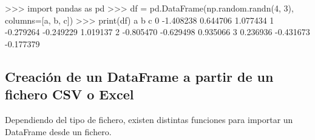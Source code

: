 \documentclass[
  spanish,
  a4paper,
]{scrreport}
\newenvironment{Shaded}{\begin{snugshade}}{\end{snugshade}}
\newcommand{\BuiltInTok}[1]{\textcolor[rgb]{0.00,0.23,0.31}{#1}}
\newcommand{\DecValTok}[1]{\textcolor[rgb]{0.68,0.00,0.00}{#1}}
\newcommand{\FloatTok}[1]{\textcolor[rgb]{0.68,0.00,0.00}{#1}}
\newcommand{\ImportTok}[1]{\textcolor[rgb]{0.00,0.46,0.62}{#1}}
\newcommand{\NormalTok}[1]{\textcolor[rgb]{0.00,0.23,0.31}{#1}}
\newcommand{\OperatorTok}[1]{\textcolor[rgb]{0.37,0.37,0.37}{#1}}
\newcommand{\StringTok}[1]{\textcolor[rgb]{0.13,0.47,0.30}{#1}}
\begin{document}
\begin{Shaded}
\begin{Highlighting}[]
\OperatorTok{\textgreater{}\textgreater{}\textgreater{}} \ImportTok{import}\NormalTok{ pandas }\ImportTok{as}\NormalTok{ pd}
\OperatorTok{\textgreater{}\textgreater{}\textgreater{}}\NormalTok{ df }\OperatorTok{=}\NormalTok{ pd.DataFrame(np.random.randn(}\DecValTok{4}\NormalTok{, }\DecValTok{3}\NormalTok{), columns}\OperatorTok{=}\NormalTok{[}\StringTok{\textquotesingle{}a\textquotesingle{}}\NormalTok{, }\StringTok{\textquotesingle{}b\textquotesingle{}}\NormalTok{, }\StringTok{\textquotesingle{}c\textquotesingle{}}\NormalTok{])}
\OperatorTok{\textgreater{}\textgreater{}\textgreater{}} \BuiltInTok{print}\NormalTok{(df)}
\NormalTok{          a         b         c}
\DecValTok{0} \OperatorTok{{-}}\FloatTok{1.408238}  \FloatTok{0.644706}  \FloatTok{1.077434}
\DecValTok{1} \OperatorTok{{-}}\FloatTok{0.279264} \OperatorTok{{-}}\FloatTok{0.249229}  \FloatTok{1.019137}
\DecValTok{2} \OperatorTok{{-}}\FloatTok{0.805470} \OperatorTok{{-}}\FloatTok{0.629498}  \FloatTok{0.935066}
\DecValTok{3}  \FloatTok{0.236936} \OperatorTok{{-}}\FloatTok{0.431673} \OperatorTok{{-}}\FloatTok{0.177379}
\end{Highlighting}
\end{Shaded}

\subsection{Creación de un DataFrame a partir de un fichero CSV o
Excel}\label{creaciuxf3n-de-un-dataframe-a-partir-de-un-fichero-csv-o-excel}

Dependiendo del tipo de fichero, existen distintas funciones para
importar un DataFrame desde un fichero.
\end{document}

